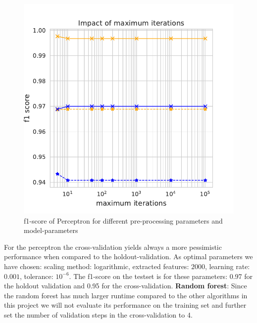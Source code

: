 \documentclass[11pt]{article}
\begin{document}
\begin{figure}
\begin{minipage}[t]{0.3\textwidth}
\end{minipage}
\begin{minipage}[t]{0.3\textwidth}
\includegraphics[width=1\linewidth]{email_spam/perc_maxiter.pdf}
\end{minipage}
\begin{minipage}[t]{0.3\textwidth}

\end{minipage}
   \caption{f1-score of Perceptron for different pre-processing parameters and model-parameters}
\label{spamfig_fig1}
\end{figure}

For the perceptron the cross-validation yields always a more pessimistic performance when compared to the holdout-validation. As optimal parameters we have chosen: scaling method: logarithmic, extracted features: $2000$, learning rate: $0.001$, tolerance: $10^{-6}$. The f1-score on the testset is for these parameters: 0.97 for the holdout validation and 0.95 for the cross-validation.
\newline
\textbf{Random forest}:
Since the random forest has much larger runtime compared to the other algorithms in this project we will not evaluate its performance on the training set and further set the number of validation steps in the cross-validation to 4.
\end{document}
